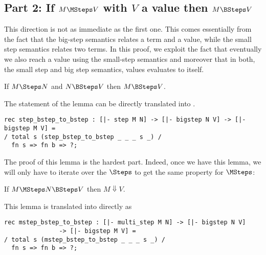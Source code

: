 \subsection{Part 2: If $M \MSteps V$ with $V$ a value then $M \BSteps V$ }

This direction is not as immediate as the first one. This comes essentially from
the fact that the big-step semantics relates a term and a value, while the
small step semantics relates two terms. In this proof, we
exploit the fact that eventually we also reach a value using the
small-step semantics and moreover that in both, the small step and big
step semantics, values evaluates to itself.


\begin{lemma}\label{lem:step-bstep-to-bstep}
  If $M \Steps N$ and $N \BSteps V$ then $M \BSteps V$.
\end{lemma}

The statement of the lemma can be directly translated into \beluga.

\begin{lstlisting}
rec step_bstep_to_bstep : [|- step M N] -> [|- bigstep N V] -> [|- bigstep M V] =
/ total s (step_bstep_to_bstep _ _ _ s _) /
  fn s => fn b => ?;
\end{lstlisting}

The proof of this lemma is the hardest part. Indeed, once we have this lemma, we will only
have to iterate over the $\Steps$ to get the same property for $\MSteps$:

\begin{lemma}\label{lem:mstep-bstep-to-bstep}
  If $M \MSteps N \BSteps V$ then $M \Downarrow V$.
\end{lemma}

This lemma is translated into \beluga directly as

  \begin{lstlisting}
rec mstep_bstep_to_bstep : [|- multi_step M N] -> [|- bigstep N V]
			   -> [|- bigstep M V] =
/ total s (mstep_bstep_to_bstep _ _ _ s _) /
  fn s => fn b => ?;
  \end{lstlisting}

